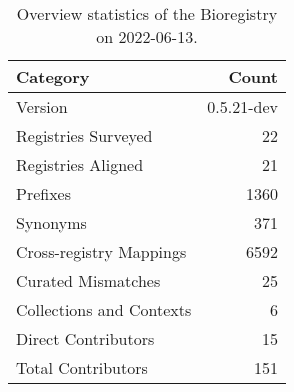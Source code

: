 \begin{table}
\centering
\caption{Overview statistics of the Bioregistry on 2022-06-13.}
\label{tab:bioregistry-summary}
\begin{tabular}{lr}
\toprule
                Category &      Count \\
\midrule
                 Version & 0.5.21-dev \\
     Registries Surveyed &         22 \\
      Registries Aligned &         21 \\
                Prefixes &       1360 \\
                Synonyms &        371 \\
 Cross-registry Mappings &       6592 \\
      Curated Mismatches &         25 \\
Collections and Contexts &          6 \\
     Direct Contributors &         15 \\
      Total Contributors &        151 \\
\bottomrule
\end{tabular}
\end{table}
